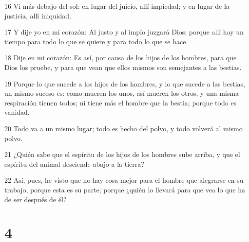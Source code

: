 \par 16 Vi más debajo del sol: en lugar del juicio, allí impiedad; y en lugar de la justicia, allí iniquidad.
\par 17 Y dije yo en mi corazón: Al justo y al impío juzgará Dios; porque allí hay un tiempo para todo lo que se quiere y para todo lo que se hace.
\par 18 Dije en mi corazón: Es así, por causa de los hijos de los hombres, para que Dios los pruebe, y para que vean que ellos mismos son semejantes a las bestias.
\par 19 Porque lo que sucede a los hijos de los hombres, y lo que sucede a las bestias, un mismo suceso es: como mueren los unos, así mueren los otros, y una misma respiración tienen todos; ni tiene más el hombre que la bestia; porque todo es vanidad.
\par 20 Todo va a un mismo lugar; todo es hecho del polvo, y todo volverá al mismo polvo.
\par 21 ¿Quién sabe que el espíritu de los hijos de los hombres sube arriba, y que el espíritu del animal desciende abajo a la tierra?
\par 22 Así, pues, he visto que no hay cosa mejor para el hombre que alegrarse en su trabajo, porque esta es su parte; porque ¿quién lo llevará para que vea lo que ha de ser después de él?

\chapter{4}

